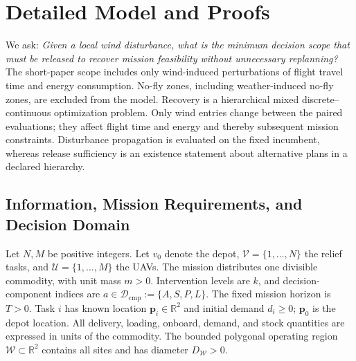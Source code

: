 \section{Detailed Model and Proofs}
\label{sec:detailed_model}

We ask: \emph{Given a local wind disturbance, what is the minimum decision
scope that must be released to recover mission feasibility without
unnecessary replanning?} The short-paper scope includes only wind-induced
perturbations of flight travel time and energy consumption. No-fly zones,
including weather-induced no-fly zones, are excluded from the model.
Recovery is a hierarchical mixed discrete--continuous optimization problem.
Only wind entries change between the paired evaluations; they affect
flight time and energy and thereby subsequent mission constraints.
Disturbance propagation is evaluated on the
fixed incumbent, whereas release sufficiency is an existence statement
about alternative plans in a declared hierarchy.

\subsection{Information, Mission Requirements, and Decision Domain}
\label{subsec:information_remaining}

Let $N,M$ be positive integers. Let $v_0$ denote the depot,
$\mathcal V=\{1,\ldots,N\}$ the relief tasks, and
$\mathcal U=\{1,\ldots,M\}$ the UAVs. The mission distributes one divisible
commodity, with unit mass $m>0$. Intervention levels are $k$,
and decision-component indices are
$a\in\mathcal D_{\mathrm{cmp}}:=\{A,S,P,L\}$.
The fixed mission horizon is $T>0$. Task $i$ has known location
$\mathbf p_i\in\mathbb R^2$ and initial demand $d_i\ge0$;
$\mathbf p_0$ is the depot location. All delivery, loading, onboard,
demand, and stock quantities are expressed in units of the commodity.
The bounded polygonal operating region $\mathcal W\subset\mathbb R^2$ contains all
sites and has diameter $D_{\mathcal W}>0$.

